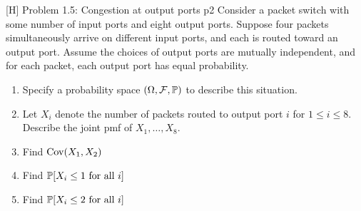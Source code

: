 \documentclass[a4paper, 11pt]{article}
\begin{document}
\begin{problem}{%
		[H] Problem 1.5: Congestion at output ports
	}{p2%
	}
Consider a packet switch with some number
of input ports and eight output ports. Suppose four packets simultaneously arrive
on different input ports, and each is routed toward an output port. Assume the
choices of output ports are mutually independent, and for each packet, each
output port has equal probability.\begin{enumerate}[label=(\alph*)]
	\item Specify a probability space $(\Omega,\mathcal{F},\mathbb{P})$ to describe this situation.
	\item Let $X_i$ denote the number of packets routed to output port $i$ for $1\leq i\leq 8$. Describe the joint pmf of $X_1,\dots,X_8$.
	\item Find $\operatorname{Cov}(X_1,X_2)$
	\item Find $\mathbb{P}[X_i\leq 1 \text{ for all $i$}]$
	\item Find $\mathbb{P}[X_i\leq 2 \text{ for all $i$}]$
\end{enumerate}
\end{problem}
\end{document}
